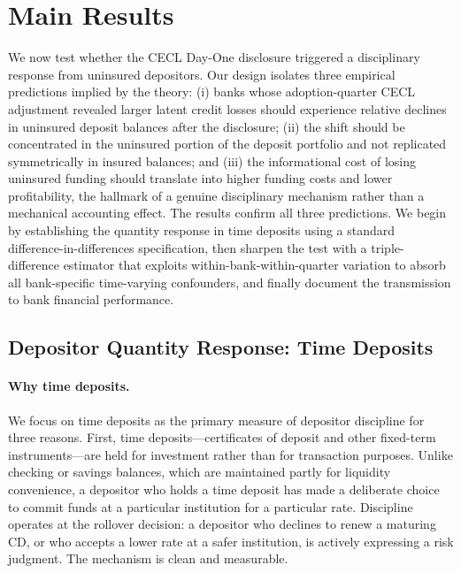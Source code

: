 
\section{Main Results}
\label{sec:results}

We now test whether the CECL Day-One disclosure triggered a disciplinary
response from uninsured depositors.  Our design isolates three empirical
predictions implied by the theory: (i) banks whose adoption-quarter CECL
adjustment revealed larger latent credit losses should experience relative
declines in uninsured deposit balances after the disclosure; (ii) the shift
should be concentrated in the uninsured portion of the deposit portfolio and not
replicated symmetrically in insured balances; and (iii) the informational cost of
losing uninsured funding should translate into higher funding costs and lower
profitability, the hallmark of a genuine disciplinary mechanism rather than a
mechanical accounting effect.  The results confirm all three predictions.  We
begin by establishing the quantity response in time deposits using a standard
difference-in-differences specification, then sharpen the test with a
triple-difference estimator that exploits within-bank-within-quarter variation to
absorb all bank-specific time-varying confounders, and finally document the
transmission to bank financial performance.

\subsection{Depositor Quantity Response: Time Deposits}
\label{sec:results:time_deposits}

\paragraph{Why time deposits.}
We focus on time deposits as the primary measure of depositor discipline for
three reasons.  First, time deposits---certificates of deposit and other
fixed-term instruments---are held for investment rather than for transaction
purposes.  Unlike checking or savings balances, which are maintained partly for
liquidity convenience, a depositor who holds a time deposit has made a deliberate
choice to commit funds at a particular institution for a particular rate.
Discipline operates at the rollover decision: a depositor who declines to renew a
maturing CD, or who accepts a lower rate at a safer institution, is actively
expressing a risk judgment.  The mechanism is clean and measurable.

